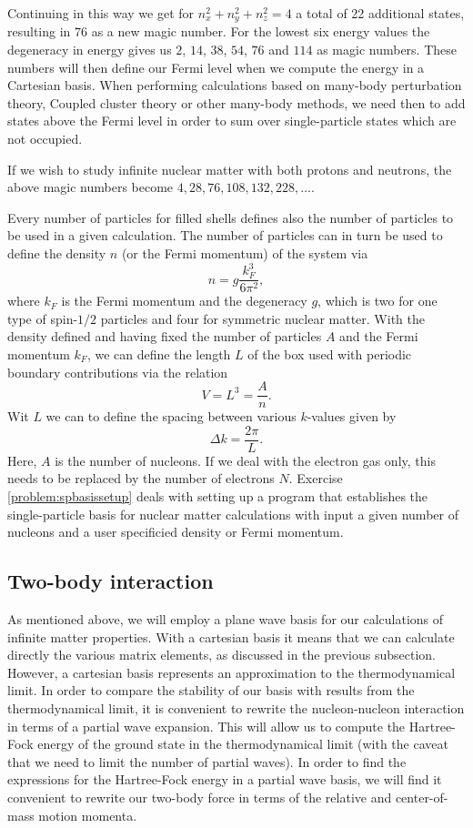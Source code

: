 Continuing in this way we get for $n_{x}^{2}+n_{y}^{2}+n_{z}^{2}=4$ a
total of 22 additional states, resulting in $76$ as a new magic
number. For the lowest six energy values the degeneracy in energy
gives us $2$, $14$, $38$, $54$, $76$ and $114$ as magic numbers. These
numbers will then define our Fermi level when we compute the energy in
a Cartesian basis. When performing calculations based on many-body
perturbation theory, Coupled cluster theory or other many-body
methods, we need then to add states above the Fermi level in order to
sum over single-particle states which are not occupied.

If we wish to study infinite nuclear matter with both protons and
neutrons, the above magic numbers become $4, 28, 76, 108, 132, 228,
\dots$.

Every number of particles for filled shells defines also the number of
particles to be used in a given calculation. The number of particles
can in turn be used to define the density $n$ (or the Fermi momentum)
of the system via
\[
n = g \frac{k_F^3}{6\pi^2},
\]
where $k_F$ is the Fermi momentum and the degeneracy $g$, which is two
for one type of spin-$1/2$ particles and four for symmetric nuclear
matter.  With the density defined and having fixed the number of
particles $A$ and the Fermi momentum $k_F$, we can define the length
$L$ of the box used with periodic boundary contributions via the
relation
\[
  V= L^3= \frac{A}{n}.
\]
Wit $L$ we can to define the spacing between various
$k$-values given by
\[
  \Delta k = \frac{2\pi}{L}.
\]
Here, $A$ is the number of nucleons. If we deal with the electron
gas only, this needs to be replaced by the number of electrons $N$.
Exercise \ref{problem:spbasissetup} deals with setting up a program
that establishes the single-particle basis for nuclear matter
calculations with input a given number of nucleons and a user
specificied density or Fermi momentum.


\subsection{Two-body interaction}

As mentioned above, we will employ a plane wave basis for our
calculations of infinite matter properties. With a cartesian basis it
means that we can calculate directly the various matrix elements, as
discussed in the previous subsection. However, a cartesian basis
represents an approximation to the thermodynamical limit. In order to
compare the stability of our basis with results from the
thermodynamical limit, it is convenient to rewrite the nucleon-nucleon
interaction in terms of a partial wave expansion. This will allow us
to compute the Hartree-Fock energy of the ground state in the
thermodynamical limit (with the caveat that we need to limit the
number of partial waves). In order to find the expressions for the
Hartree-Fock energy in a partial wave basis, we will find it
convenient to rewrite our two-body force in terms of the relative and
center-of-mass motion momenta.

